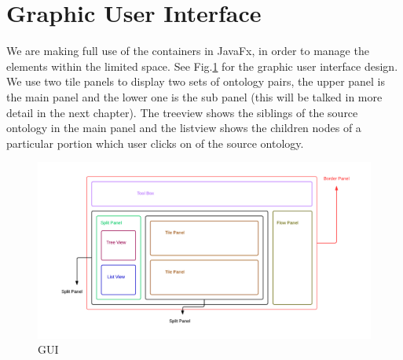 \section{Graphic User Interface}
We are making full use of the containers in JavaFx, in order to manage the elements within the limited space. See Fig.\ref{fig:ui} for the graphic user interface design. We use two tile panels to display two sets of ontology pairs, the upper panel is the main panel and the lower one is the sub panel (this will be talked in more detail in the next chapter). The treeview shows the siblings of the source ontology in the main panel and the listview shows the children nodes of a particular portion which user clicks on of the source ontology. 

\begin{figure}[!ht]
	\centering
	\includegraphics[width=6.5in]{pics/VA_UI.png}
	\caption{GUI}
	\label{fig:ui}
\end{figure}
